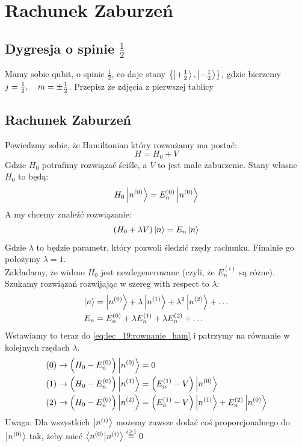 \documentclass[12pt,a4paper]{report}
\newcommand{\com}[1]{{\color{red} #1}}
\newcommand{\uwaga}[1]{{\color{violet} Uwaga:} #1}
\newenvironment{lecture}[1]{\par\medskip
   \noindent\chapter{#1} \rmfamily}{\medskip}
\begin{document}

\begin{lecture}{Rachunek Zaburzeń}
    \section{Dygresja o spinie $\frac12$}
    Mamy sobie qubit, o spinie $\frac12$, co daje stany $\qty{\ket{+\frac12}, \ket{-\frac12}}$, gdzie bierzemy $j=\frac12\qc m = \pm \frac12$. 
    \com{Przepisz ze zdjęcia z pierwszej tablicy}
    \section{Rachunek Zaburzeń}
    Powiedzmy sobie, że Hamiltonian który rozważamy ma postać:
    \[
        H = H_0 + V
    \]
    Gdzie $H_0$ potrafimy rozwiązać ściśle, a $V$ to jest małe zaburzenie. Stany własne $H_0$ to będą:
    \[
        H_0 \ket{n^{(0)}} = E^{(0)}_n \ket{n^{(0)}}  
    \]
    A my chcemy znaleźć rozwiązanie:
    \begin{equation}
        \qty(H_0 + \lambda V) \ket{n} = E_n \ket{n}  
        \label{eq:lec_19:rownanie_ham}
    \end{equation}
    Gdzie $\lambda$ to będzie parametr, który pozwoli śledzić rzędy rachunku. Finalnie go położymy $\lambda = 1$.\\
    Zakładamy, że widmo $H_0$ jest nezdegenerowane (czyli, że $E_n^{(i)}$ są różne). Szukamy rozwiązań rozwijając w szereg with respect to $\lambda$:
    \begin{align*}
        \ket{n} &= \ket{n^{(0)}} + \lambda\ket{n^{(1)}} + \lambda^2\ket{n^{(2)}} + \dots\\
        E_n &= E_n^{(0)} + \lambda E_n^{(1)} + \lambda E_n^{(2)} + \dots
    \end{align*}
    Wstawiamy to teraz do \eqref{eq:lec_19:rownanie_ham} i patrzymy na równanie w kolejnych rzędach $\lambda$.
    \begin{align*}
        (0) &\to \qty(H_0 - E_n^{(0)}) \ket{n^{(0)}} = 0\\
        (1) &\to \qty(H_0 - E_n^{(0)}) \ket{n^{(1)}} =  \qty(E_n^{(1)} - V) \ket{n^{(0)}}\\
        (2) &\to \qty(H_0 - E_n^{(0)}) \ket{n^{(2)}} =  \qty(E_n^{(1)} - V) \ket{n^{(1)}} + E_n^{(2)}\ket{n^{(0)}}\\
    \end{align*}
    \uwaga{Dla wszystkich $\ket{n^{(i)}}$ możemy zawsze dodać coś proporcjonalnego do $\ket{n^{(0)}}$ tak, żeby mieć $\braket{n^{(0)}}{n^{(i)}}  \stackrel{i\geq1}{=}0$}

\end{lecture}
\end{document}
